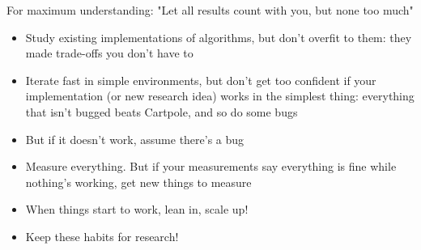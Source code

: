 \documentclass[9pt]{beamer}
\begin{document}
\begin{frame}{For maximum understanding: "Let all results count with you, but none too much"}

\begin{itemize}
\item Study existing implementations of algorithms, but don't overfit to them: they made trade-offs you don't have to
\item Iterate fast in simple environments, but don't get too confident if your implementation (or new research idea) works in the simplest thing: everything that isn't bugged beats Cartpole, and so do some bugs
\item But if it doesn't work, assume there's a bug
\item Measure everything. But if your measurements say everything is fine while nothing's working, get new things to measure
\item When things start to work, lean in, scale up!
\item Keep these habits for research!
\end{itemize}

\end{frame}
\end{document}
